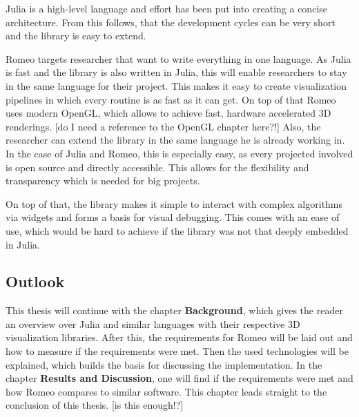 Julia is a high-level language and effort has been put into creating a concise architecture. From this follows, that the development cycles can be very short and the library is easy to extend.

Romeo targets researcher that want to write everything in one language.
As Julia is fast and the library is also written in Julia, this will enable researchers to stay in the same language for their project. 
This makes it easy to create visualization pipelines in which every routine is as fast as it can get. 
On top of that Romeo uses modern OpenGL, which allows to achieve fast, hardware accelerated 3D renderings. [do I need a reference to the OpenGL chapter here?!]
Also, the researcher can extend the library in the same language he is already working in. 
In the case of Julia and Romeo, this is especially easy, as every projected involved is open source and directly accessible.
This allows for the flexibility and transparency which is needed for big projects.

On top of that, the library makes it simple to interact with complex algorithms via widgets and forms a basis for visual debugging. 
This comes with an ease of use, which would be hard to achieve if the library was not that deeply embedded in Julia.


\subsection{Outlook}
This thesis will continue with the chapter \textbf{Background}, which gives the reader an overview over Julia and similar languages with their respective 3D visualization libraries.
After this, the requirements for Romeo will be laid out and how to measure if the requirements were met.
Then the used technologies will be explained, which builds the basis for discussing the implementation.
In the chapter \textbf{Results and Discussion}, one will find if the requirements were met and how Romeo compares to similar software.
This chapter leads straight to the conclusion of this thesis.
[is this enough!?]